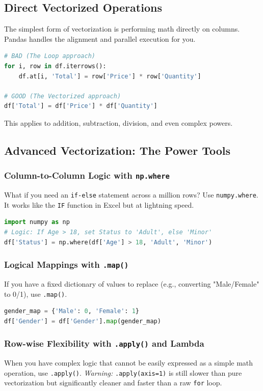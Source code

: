 \documentclass{article}
\begin{document}
\subsection{Direct Vectorized Operations}
The simplest form of vectorization is performing math directly on columns. Pandas handles the alignment and parallel execution for you.

\begin{lstlisting}[language=Python]
# BAD (The Loop approach)
for i, row in df.iterrows():
    df.at[i, 'Total'] = row['Price'] * row['Quantity']

# GOOD (The Vectorized approach)
df['Total'] = df['Price'] * df['Quantity']
\end{lstlisting}

This applies to addition, subtraction, division, and even complex powers.

\subsection{Advanced Vectorization: The Power Tools}

\subsubsection{Column-to-Column Logic with \texttt{np.where}}
What if you need an \texttt{if-else} statement across a million rows? Use \texttt{numpy.where}. It works like the \texttt{IF} function in Excel but at lightning speed.

\begin{lstlisting}[language=Python]
import numpy as np
# Logic: If Age > 18, set Status to 'Adult', else 'Minor'
df['Status'] = np.where(df['Age'] > 18, 'Adult', 'Minor')
\end{lstlisting}

\subsubsection{Logical Mappings with \texttt{.map()}}
If you have a fixed dictionary of values to replace (e.g., converting "Male/Female" to 0/1), use \texttt{.map()}.

\begin{lstlisting}[language=Python]
gender_map = {'Male': 0, 'Female': 1}
df['Gender'] = df['Gender'].map(gender_map)
\end{lstlisting}

\subsubsection{Row-wise Flexibility with \texttt{.apply()} and Lambda}
When you have complex logic that cannot be easily expressed as a simple math operation, use \texttt{.apply()}.
\textit{Warning:} \texttt{.apply(axis=1)} is still slower than pure vectorization but significantly cleaner and faster than a raw \texttt{for} loop.
\end{document}
